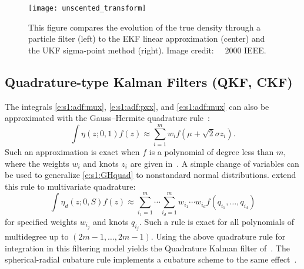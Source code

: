 \begin{figure}[h]
\begin{minipage}[c]{.49\textwidth}
\caption[The Unscented Transform and UKF]{This figure compares the evolution of the true density through a particle filter (left) to the EKF linear approximation (center) and the UKF sigma-point method (right).  Image credit: \textcite{Wan00}~\textcopyright~2000 IEEE.}
\end{minipage}
\hfill
\begin{minipage}[c]{.49\textwidth}
\texttt{[image: unscented\_transform]}
\end{minipage}
\end{figure}

\subsection{Quadrature-type Kalman Filters (QKF, CKF)} 
The integrals \eqref{e:s1:adf:mux}, \eqref{e:s1:adf:pxx}, and \eqref{e:s1:adf:mux} can also be approximated with the Gauss--Hermite quadrature rule~\cite{Nay82}:  
\begin{equation} \label{e:s1:GHquad}
\int \eta(z;0,1) f(z) \approx \sum_{i=1}^m w_i f(\mu+\sqrt{2}\sigma z_i).
\end{equation}
Such an approximation is exact when $f$ is a polynomial of degree less than $m$, where the weights $w_i$ and knots $z_i$ are given in~\cite{Gol73}.  A simple change of variables can be used to generalize \eqref{e:s1:GHquad} to nonstandard normal distributions.  \textcite{Ito00b} extend this rule to multivariate quadrature:
\begin{equation} \label{e:s1:GHmultiv}
\int \eta_d(z;0,S) f(z) \approx \sum_{i_1=1}^m \dotsb \sum_{i_d=1}^m w_{i_1}\dotsb w_{i_d} f(q_{i_1},\dotsc, q_{i_d})
\end{equation}
for specified weights $w_{i_j}$ and knots $q_{i_j}$. Such a rule is exact for all polynomials of multidegree up to $(2m-1,\dotsc,2m-1)$.  Using the above quadrature rule for integration in this filtering model yields the Quadrature Kalman filter of~\textcite{Cha00,Ito00b}.  The spherical-radial cubature rule implements a cubature scheme to the same effect~\cite[the Cubature--Quadrature Kalman filter of][]{Ara07,Ara09}.

